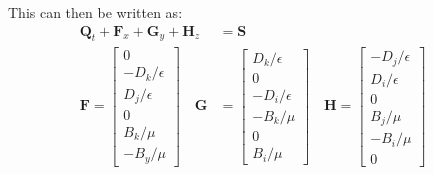 \documentclass[12pt]{article}
\begin{document}
	This can then be written as:
	\begin{align}
		\mathbf{Q}_t + \mathbf{F}_x + \mathbf{G}_y + \mathbf{H}_z &= \mathbf{S} \\
		\mathbf{F} = 
			\begin{bmatrix}
     			0 \\
     			-D_k/\epsilon \\
     			D_j/\epsilon \\
     			0 \\
     			B_k /\mu \\
     			-B_y/\mu
     		\end{bmatrix} \quad
     	\mathbf{G} &= 
			\begin{bmatrix}
     			D_k/\epsilon \\
     			0 \\
     			-D_i/\epsilon \\
     			-B_k /\mu \\
     			0\\
     			B_i/\mu
     		\end{bmatrix} \quad
     	\mathbf{H} = 
			\begin{bmatrix}
     			-D_j/\epsilon \\
     			D_i/\epsilon \\
				0 \\     			
     			B_j /\mu \\
     			-B_i/\mu \\
     			0
     		\end{bmatrix} \quad
	\end{align}
	
\end{document}
